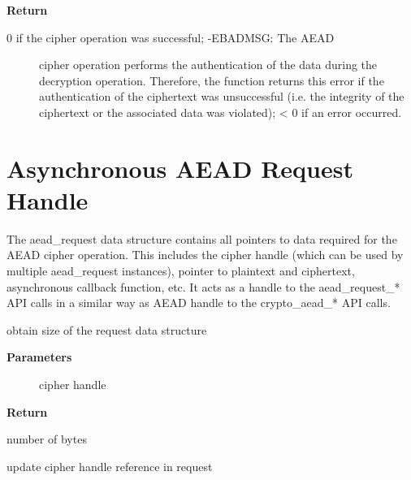 \documentclass[a4paper,8pt,english]{sphinxmanual}
\begin{document}
\textbf{Return}
\begin{description}
\item[{0 if the cipher operation was successful; -EBADMSG: The AEAD}] \leavevmode
cipher operation performs the authentication of the data during the
decryption operation. Therefore, the function returns this error if
the authentication of the ciphertext was unsuccessful (i.e. the
integrity of the ciphertext or the associated data was violated);
\textless{} 0 if an error occurred.

\end{description}


\section{Asynchronous AEAD Request Handle}
\label{crypto/api-aead:asynchronous-aead-request-handle}
The aead\_request data structure contains all pointers to data required for
the AEAD cipher operation. This includes the cipher handle (which can be
used by multiple aead\_request instances), pointer to plaintext and
ciphertext, asynchronous callback function, etc. It acts as a handle to the
aead\_request\_* API calls in a similar way as AEAD handle to the
crypto\_aead\_* API calls.

\begin{fulllineitems}
\label{crypto/api-aead:c.crypto_aead_reqsize}
obtain size of the request data structure

\end{fulllineitems}


\textbf{Parameters}
\begin{description}
\item[{}] \leavevmode
cipher handle

\end{description}

\textbf{Return}

number of bytes

\begin{fulllineitems}
\label{crypto/api-aead:c.aead_request_set_tfm}
update cipher handle reference in request

\end{fulllineitems}
\end{document}
